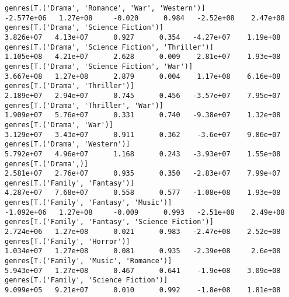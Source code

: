 \documentclass[11pt]{article}
\begin{document}
\begin{Verbatim}[commandchars=\\\{\}]
genres[T.('Drama', 'Romance', 'War', 'Western')]                                                             -2.577e+06   1.27e+08     -0.020      0.984   -2.52e+08    2.47e+08
genres[T.('Drama', 'Science Fiction')]                                                                        3.826e+07   4.13e+07      0.927      0.354   -4.27e+07    1.19e+08
genres[T.('Drama', 'Science Fiction', 'Thriller')]                                                            1.105e+08   4.21e+07      2.628      0.009    2.81e+07    1.93e+08
genres[T.('Drama', 'Science Fiction', 'War')]                                                                 3.667e+08   1.27e+08      2.879      0.004    1.17e+08    6.16e+08
genres[T.('Drama', 'Thriller')]                                                                               2.189e+07   2.94e+07      0.745      0.456   -3.57e+07    7.95e+07
genres[T.('Drama', 'Thriller', 'War')]                                                                        1.909e+07   5.76e+07      0.331      0.740   -9.38e+07    1.32e+08
genres[T.('Drama', 'War')]                                                                                    3.129e+07   3.43e+07      0.911      0.362    -3.6e+07    9.86e+07
genres[T.('Drama', 'Western')]                                                                                5.792e+07   4.96e+07      1.168      0.243   -3.93e+07    1.55e+08
genres[T.('Drama',)]                                                                                          2.581e+07   2.76e+07      0.935      0.350   -2.83e+07    7.99e+07
genres[T.('Family', 'Fantasy')]                                                                               4.287e+07   7.68e+07      0.558      0.577   -1.08e+08    1.93e+08
genres[T.('Family', 'Fantasy', 'Music')]                                                                     -1.092e+06   1.27e+08     -0.009      0.993   -2.51e+08    2.49e+08
genres[T.('Family', 'Fantasy', 'Science Fiction')]                                                            2.724e+06   1.27e+08      0.021      0.983   -2.47e+08    2.52e+08
genres[T.('Family', 'Horror')]                                                                                1.034e+07   1.27e+08      0.081      0.935   -2.39e+08     2.6e+08
genres[T.('Family', 'Music', 'Romance')]                                                                      5.943e+07   1.27e+08      0.467      0.641    -1.9e+08    3.09e+08
genres[T.('Family', 'Science Fiction')]                                                                       9.099e+05   9.21e+07      0.010      0.992    -1.8e+08    1.81e+08

\end{Verbatim}
\end{document}
